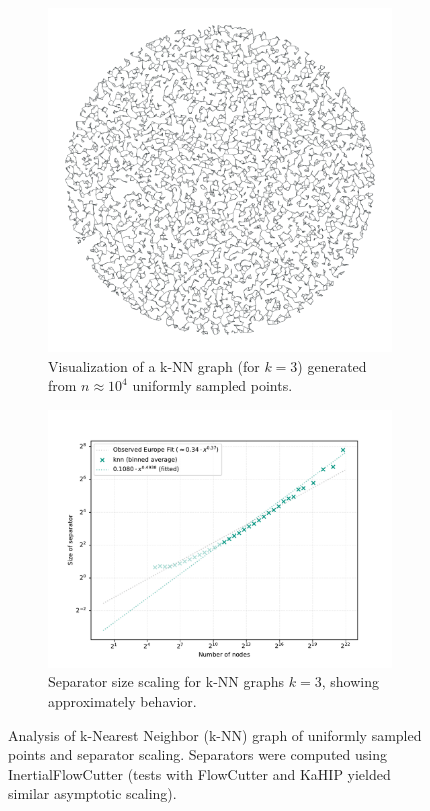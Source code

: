 \begin{figure}[tbhp]
	\centering
	\begin{subfigure}[t]{0.38\linewidth}
		\centering
		\includegraphics[width=\linewidth]{graphics/knn.png}
		\caption{Visualization of a k-NN graph (for \(k=3\)) generated from \(n \approx 10^4\) uniformly sampled points.}
		\label{fig:knn_graph_structure_viz}
	\end{subfigure}
	\hfill
	\begin{subfigure}[t]{0.55\linewidth}
		\centering
		\includegraphics[width=\linewidth]{graphics/knn_seps.pdf}
		\caption{Separator size scaling for k-NN graphs \(k=3\), showing approximately  behavior.}
		\label{fig:knn_graph_sep_scaling_plot}
	\end{subfigure}
	\caption{Analysis of k-Nearest Neighbor (k-NN) graph of uniformly sampled points and separator scaling. Separators were computed using InertialFlowCutter (tests with FlowCutter and KaHIP yielded similar asymptotic scaling).}
	\label{fig:knn_graph_analysis}
\end{figure}

